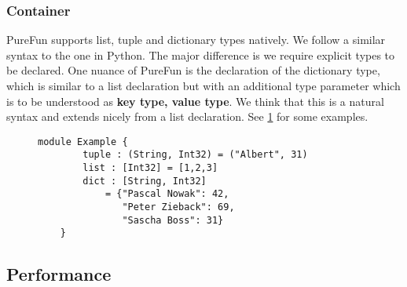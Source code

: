 \subsubsection{Container} PureFun supports list, tuple and dictionary types natively. We follow a similar syntax to the one in Python. The major difference is we require explicit types to be declared. One nuance of PureFun is the declaration of the dictionary type, which is similar to a list declaration but with an additional type parameter which is to be understood as \textbf{key type, value type}. We think that this is a natural syntax and extends nicely from a list declaration. See \ref{lst:cont} for some examples.

\begin{figure}
	\label{lst:cont}\begin{lstlisting}[caption={Some examples of control statements in PureFun}]
	module Example {
		tuple : (String, Int32) = ("Albert", 31)
		list : [Int32] = [1,2,3]
		dict : [String, Int32] 
			= {"Pascal Nowak": 42,
			   "Peter Zieback": 69,
			   "Sascha Boss": 31}
	}
	\end{lstlisting}
\end{figure}

\subsection{Performance}